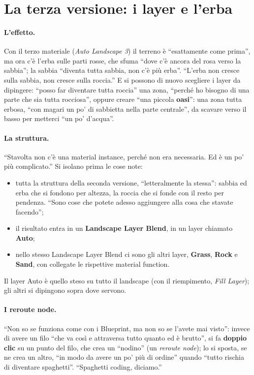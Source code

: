\section{La terza versione: i layer e l'erba}
\label{ue15:sec:layer}

\paragraph{L'effetto.} Con il terzo materiale (\emph{Auto Landscape 3}) il terreno è
``esattamente come prima'', ma ora c'è l'erba sulle parti rosse, che sfuma ``dove c'è ancora
del rosa verso la sabbia''; la sabbia ``diventa tutta sabbia, non c'è più erba''. ``L'erba
non cresce sulla sabbia, non cresce sulla roccia.'' E si possono di nuovo scegliere i layer
da dipingere: ``posso far diventare tutta roccia'' una zona, ``perché ho bisogno di una parte
che sia tutta rocciosa'', oppure creare ``una piccola \textbf{oasi}'': una zona tutta erbosa,
``con magari un po' di sabbietta nella parte centrale'', da scavare verso il basso per metterci
``un po' d'acqua''.

\paragraph{La struttura.} ``Stavolta non c'è una material instance, perché non era
necessaria. Ed è un po' più complicato.'' Si isolano prima le cose note:
\begin{itemize}
  \item tutta la struttura della seconda versione, ``letteralmente la stessa'': sabbia ed
        erba che si fondono per altezza, la roccia che si fonde con il resto per pendenza.
        ``Sono cose che potete adesso aggiungere alla cosa che stavate facendo'';
  \item il risultato entra in un \textbf{Landscape Layer Blend}, in un layer chiamato
        \textbf{Auto};
  \item nello stesso Landscape Layer Blend ci sono gli altri layer, \textbf{Grass},
        \textbf{Rock} e \textbf{Sand}, con collegate le rispettive material function.
\end{itemize}
Il layer Auto è quello steso su tutto il landscape (con il riempimento, \emph{Fill Layer});
gli altri si dipingono sopra dove servono.

\paragraph{I reroute node.} ``Non so se funziona come con i Blueprint, ma non so se l'avete
mai visto'': invece di avere un filo ``che va così e attraversa tutto quanto ed è brutto'', si
fa \textbf{doppio clic} su un punto del filo, che crea un ``nodino'' (un \emph{reroute
node}); lo si sposta, se ne crea un altro, ``in modo da avere un po' più di ordine'' quando
``tutto rischia di diventare spaghetti''. ``Spaghetti coding, diciamo.''

